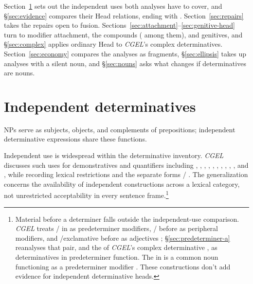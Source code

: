 \documentclass[12pt]{article}
\begin{document}
Section~\ref{sec:independent} sets out the independent uses both analyses have to cover, and §\ref{sec:evidence} compares their Head relations, ending with . Section~\ref{sec:repairs} takes the repairs open to fusion. Sections~\ref{sec:attachment}--\ref{sec:genitive-head} turn to modifier attachment, the compounds ( among them), and genitives, and §\ref{sec:complex} applies ordinary Head to \textit{CGEL}'s complex determinatives. Section~\ref{sec:economy} compares the analyses as fragments, §\ref{sec:ellipsis} takes up analyses with a silent noun, and §\ref{sec:nouns} asks what changes if determinatives are nouns.

\section{Independent determinatives}\label{sec:independent}

NPs serve as subjects, objects, and complements of prepositions; independent determinative expressions share these functions.

Independent use is widespread within the determinative inventory. \textit{CGEL} discusses such uses for demonstratives and quantifiers including , , , , , , , , , , and , while recording lexical restrictions and the separate forms / \citep[371--372, 410--424]{huddleston2002}. The generalization concerns the availability of independent constructions across a lexical category, not unrestricted acceptability in every sentence frame.\footnote{Material before a determiner falls outside the independent-use comparison. \textit{CGEL} treats / in  as predeterminer modifiers, / before  as peripheral modifiers, and /exclamative  before  as adjectives \citep[433--437]{huddleston2002}; §\ref{sec:predeterminer-a} reanalyses that pair, and the  of \textit{CGEL}'s complex determinative  \citep[394]{huddleston2002}, as determinatives in predeterminer function. The  in  is a common noun functioning as a predeterminer modifier \citep[434]{huddleston2002}. These constructions don't add evidence for independent determinative heads.}
\end{document}
